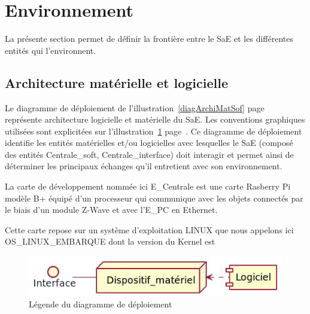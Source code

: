 \documentclass[10pt,a4paper]{report}
\begin{document}
		\section{Environnement}
	
La présente section permet de définir la frontière entre le SaE et les différentes entités qui l'environnent.

			\subsection{Architecture matérielle et logicielle}
			
Le diagramme de déploiement de l'illustration~\ref{diagArchiMatSof} page~\pageref{diagArchiMatSof}  représente architecture logicielle et matérielle du SaE. Les conventions graphiques utilisées sont explicitées sur l'illustration~\ref{diagDeploiLegende} page~\pageref{diagDeploiLegende}. 
Ce diagramme de déploiement identifie les entités matérielles et/ou logicielles avec lesquelles le SaE (composé des entités Centrale\_soft, Centrale\_interface) doit interagir et permet ainsi de déterminer les principaux échanges qu'il entretient avec son environnement.

La carte de développement nommée ici E\_Centrale est une carte Rasberry Pi modèle B+ équipé d'un processeur %
qui communique avec les objets connectés par le biais d'un module Z-Wave et avec l'E\_PC en Ethernet. %

Cette carte repose sur un système d'exploitation LINUX que nous appelons ici OS\_LINUX\_EMBARQUE dont la version du Kernel est %



\begin{figure}[H]
	\centering
	\includegraphics[scale=0.55]{diagDeploiLegende}
	\caption{Légende du diagramme de déploiement}
	\label{diagDeploiLegende}
\end{figure}
\end{document}
